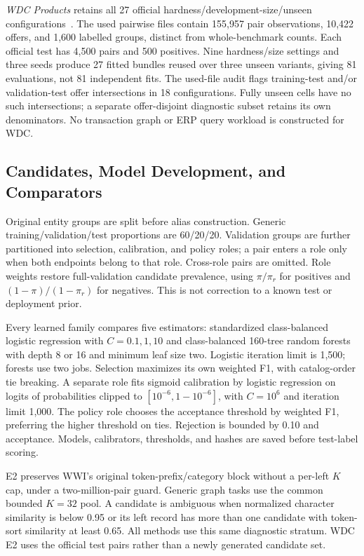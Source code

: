 \documentclass[conference,letterpaper]{IEEEtran}
\begin{document}
\emph{WDC Products} retains all 27 official hardness/development-size/unseen configurations~\cite{wdc2024,wdcdownloads}. The used pairwise files contain 155,957 pair observations, 10,422 offers, and 1,600 labelled groups, distinct from whole-benchmark counts. Each official test has 4,500 pairs and 500 positives. Nine hardness/size settings and three seeds produce 27 fitted bundles reused over three unseen variants, giving 81 evaluations, not 81 independent fits. The used-file audit flags training-test and/or validation-test offer intersections in 18 configurations. Fully unseen cells have no such intersections; a separate offer-disjoint diagnostic subset retains its own denominators. No transaction graph or ERP query workload is constructed for WDC.

\subsection{Candidates, Model Development, and Comparators}
Original entity groups are split before alias construction. Generic training/validation/test proportions are 60/20/20. Validation groups are further partitioned into selection, calibration, and policy roles; a pair enters a role only when both endpoints belong to that role. Cross-role pairs are omitted. Role weights restore full-validation candidate prevalence, using $\pi/\pi_r$ for positives and $(1-\pi)/(1-\pi_r)$ for negatives. This is not correction to a known test or deployment prior.

Every learned family compares five estimators: standardized class-balanced logistic regression with $C=0.1,1,10$ and class-balanced 160-tree random forests with depth 8 or 16 and minimum leaf size two. Logistic iteration limit is 1,500; forests use two jobs. Selection maximizes its own weighted F1, with catalog-order tie breaking. A separate role fits sigmoid calibration by logistic regression on logits of probabilities clipped to $[10^{-6},1-10^{-6}]$, with $C=10^6$ and iteration limit 1,000. The policy role chooses the acceptance threshold by weighted F1, preferring the higher threshold on ties. Rejection is bounded by 0.10 and acceptance. Models, calibrators, thresholds, and hashes are saved before test-label scoring.

E2 preserves WWI's original token-prefix/category block without a per-left $K$ cap, under a two-million-pair guard. Generic graph tasks use the common bounded $K=32$ pool. A candidate is ambiguous when normalized character similarity is below 0.95 or its left record has more than one candidate with token-sort similarity at least 0.65. All methods use this same diagnostic stratum. WDC E2 uses the official test pairs rather than a newly generated candidate set.
\end{document}
